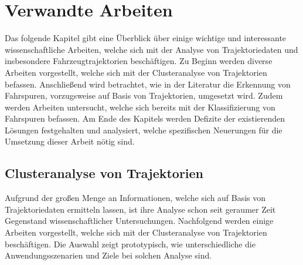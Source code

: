 ﻿%

\chapter{Verwandte Arbeiten}
\label{cha:related_work}

Das folgende Kapitel gibt eine Überblick über einige wichtige und interessante wissenschaftliche
Arbeiten, welche sich mit der Analyse von Trajektoriedaten und insbesondere Fahrzeugtrajektorien beschäftigen.
Zu Beginn werden diverse Arbeiten vorgestellt, welche sich mit der Clusteranalyse von Trajektorien befassen.
Anschließend wird betrachtet, wie in der Literatur die Erkennung von Fahrspuren, vorzugsweise auf Basis
von Trajektorien, umgesetzt wird.
Zudem werden Arbeiten untersucht, welche sich bereits mit der Klassifizierung von Fahrspuren befassen. %
Am Ende des Kapitels werden Defizite der existierenden Lösungen festgehalten und analysiert, welche
spezifischen Neuerungen für die Umsetzung dieser Arbeit nötig sind.

\section{Clusteranalyse von Trajektorien}
\label{sec:rw_clustering}

Aufgrund der großen Menge an Informationen, welche sich auf Basis von Trajektoriedaten ermitteln lassen, ist ihre
Analyse schon seit geraumer Zeit Gegenstand wissenschaftlicher Untersuchungen.
Nachfolgend werden einige Arbeiten vorgestellt, welche sich mit der Clusteranalyse von Trajektorien beschäftigen.
Die Auswahl zeigt prototypisch, wie unterschiedliche die Anwendungsszenarien und Ziele bei solchen Analyse sind.

